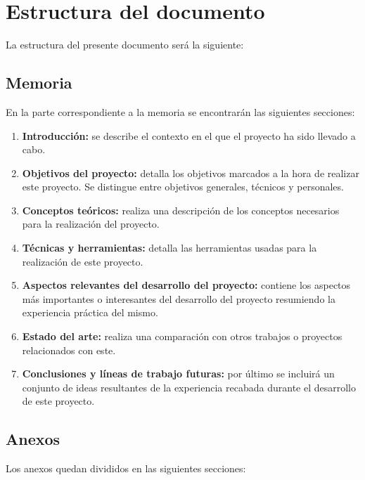 
\section{Estructura del documento}

La estructura del presente documento será la siguiente:

\subsection{Memoria}

En la parte correspondiente a la memoria se encontrarán las siguientes secciones:

\begin{enumerate}
	\item \textbf{Introducción:} se describe el contexto en el que el proyecto ha sido llevado a cabo.
	\item \textbf{Objetivos del proyecto:} detalla los objetivos marcados a la hora de realizar este proyecto. Se distingue entre objetivos generales, técnicos y personales.
	\item \textbf{Conceptos teóricos:} realiza una descripción de los conceptos necesarios para la realización del proyecto.
	\item \textbf{Técnicas y herramientas:} detalla las herramientas usadas para la
realización de este proyecto.
	\item \textbf{Aspectos relevantes del desarrollo del proyecto:} contiene los aspectos más importantes o interesantes del desarrollo del proyecto resumiendo la experiencia práctica del mismo.
	\item \textbf{Estado del arte:} realiza una comparación con otros trabajos o proyectos relacionados con este.
	\item \textbf{Conclusiones y líneas de trabajo futuras:} por último se incluirá un conjunto de ideas resultantes de la experiencia recabada durante el desarrollo de este proyecto.
\end{enumerate}


\subsection{Anexos}
Los anexos quedan divididos en las siguientes secciones:

